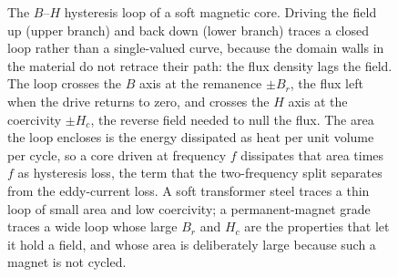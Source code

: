 \begin{figure}[htbp]
\centering
{}
\caption[Hysteresis loop of a soft magnetic material]{The $B$--$H$
hysteresis loop of a soft magnetic core. Driving the field up (upper
branch) and back down (lower branch) traces a closed loop rather than a
single-valued curve, because the domain walls in the material do not
retrace their path: the flux density lags the field. The loop crosses the
$B$ axis at the remanence $\pm B_r$, the flux left when the drive returns
to zero, and crosses the $H$ axis at the coercivity $\pm H_c$, the reverse
field needed to null the flux. The area the loop encloses is the energy
dissipated as heat per unit volume per cycle, so a core driven at
frequency $f$ dissipates that area times $f$ as hysteresis loss, the term
that the two-frequency split separates from the eddy-current loss. A soft
transformer steel traces a thin loop of small area and low coercivity; a
permanent-magnet grade traces a wide loop whose large $B_r$ and $H_c$ are
the properties that let it hold a field, and whose area is deliberately
large because such a magnet is not cycled.}
\label{fig:vol04ch08:hysteresis-loop}
\end{figure}
